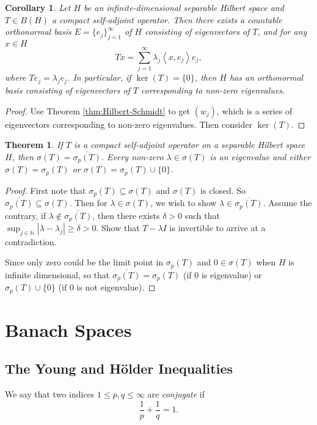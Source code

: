 \documentclass[12pt,a4paper]{report}
\numberwithin{equation}{section}
\theoremstyle{mystyle}
\newtheorem{theorem}[definition]{Theorem}
\newtheorem{corollary}[definition]{Corollary}
\newcommand{\N}{\mathbb{N}}
\newcommand{\inner}[1]{\left\langle #1 \right\rangle}
\begin{document}
	\begin{corollary}
		Let $H$ be an infinite-dimensional separable Hilbert space and $T\in B(H)$ a compact self-adjoint operator. Then there exists a countable orthonormal basis $E=\{e_j\}_{j=1}^\infty$ of $H$ consisting of eigenvectors of $T$, and for any $x\in H$
		\begin{equation}
			Tx = \sum_{j=1}^\infty \lambda_j \inner{x,e_j}e_j,
		\end{equation}
		where $Te_j=\lambda_j e_j$. In particular, if $\ker(T)=\{0\}$, then $H$ has an orthonormal basis consisting of eigenvectors of $T$ corresponding to non-zero eigenvalues.
	\end{corollary}
	\begin{proof}
		Use Theorem \ref{thm:Hilbert-Schmidt} to get $(w_j)$, which is a series of eigenvectors corresponding to non-zero eigenvalues. Then consider $\ker(T)$.
	\end{proof}
	\begin{theorem}
		If $T$ is a compact self-adjoint operator on a separable Hilbert space $H$, then $\sigma(T)=\overline{\sigma_p(T)}$. Every non-zero $\lambda\in \sigma(T)$ is an eigenvalue and either $\sigma(T)=\sigma_p(T)$ or $\sigma(T)=\sigma_p(T)\cup \{0\}$.
	\end{theorem}
	\begin{proof}
		First note that $\sigma_p(T)\subseteq \sigma(T)$ and $\sigma(T)$ is closed. So $\overline{\sigma_p(T)}\subseteq \sigma(T)$. Then for $\lambda \in \sigma(T)$, we wish to show $\lambda \in \overline{\sigma_p(T)}$. Assume the contrary, if $\lambda \notin \overline{\sigma_p(T)}$, then there exists $\delta >0$ such that $\sup_{j\in \N}|\lambda-\lambda_j|\geq \delta>0$. Show that $T-\lambda I$ is invertible to arrive at a contradiction.
		
		Since only zero could be the limit point in $\sigma_p(T)$ and $0\in \sigma(T)$ when $H$ is infinite dimensional, so that $\overline{\sigma_p(T)}=\sigma_p(T)$ (if $0$ is eigenvalue) or $\sigma_p(T)\cup\{0\}$ (if $0$ is not eigenvalue).
	\end{proof}
	
	
	
	
	\chapter{Banach Spaces}
	
	\section{The Young and H\"{o}lder Inequalities}
	We say that two indices $1\leq p,q \leq \infty$ are \emph{conjugate} if
	$$
	\frac{1}{p}+\frac{1}{q}=1.
	$$
	
\end{document}
